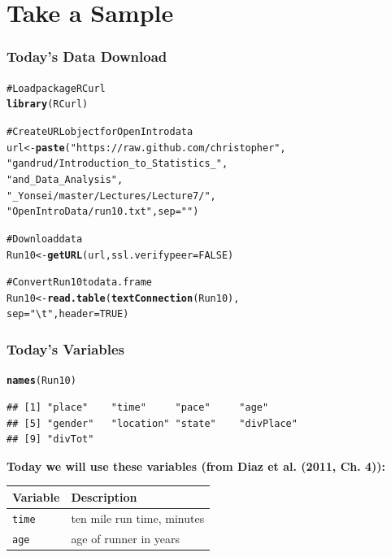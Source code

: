 \documentclass{beamer}\usepackage{graphicx, color}
\makeatletter
\newcommand{\hlfunctioncall}[1]{\textcolor[rgb]{0.501960784313725,0,0.329411764705882}{\textbf{#1}}}%
\newcommand{\hlstring}[1]{\textcolor[rgb]{0.6,0.6,1}{#1}}%
\newcommand{\hlcomment}[1]{\textcolor[rgb]{0.180392156862745,0.6,0.341176470588235}{#1}}%
\newenvironment{kframe}{%
 \def\at@end@of@kframe{}%
 \ifinner\ifhmode%
  \def\at@end@of@kframe{\end{minipage}}%
  \begin{minipage}{\columnwidth}%
 \fi\fi%
 \def\FrameCommand##1{\hskip\@totalleftmargin \hskip-\fboxsep
 \colorbox{shadecolor}{##1}\hskip-\fboxsep
     \hskip-\linewidth \hskip-\@totalleftmargin \hskip\columnwidth}%
 \MakeFramed {\advance\hsize-\width
   \@totalleftmargin\z@ \linewidth\hsize
   \@setminipage}}%
 {\par\unskip\endMakeFramed%
 \at@end@of@kframe}
\newenvironment{knitrout}{}{} %
\makeatother
\begin{document}
\section{Take a Sample}
\begin{frame}[fragile]
  \frametitle{Today's Data Download}
\begin{knitrout}
\color{fgcolor}\begin{kframe}
\begin{alltt}
\hlcomment{# Load package RCurl}
\hlfunctioncall{library}(RCurl)

\hlcomment{# Create URL object for OpenIntro data}
url <- \hlfunctioncall{paste}(\hlstring{"https://raw.github.com/christopher"},
             \hlstring{"gandrud/Introduction_to_Statistics_"},
             \hlstring{"and_Data_Analysis"},
             \hlstring{"_Yonsei/master/Lectures/Lecture7/"},
             \hlstring{"OpenIntroData/run10.txt"}, sep = \hlstring{""})

\hlcomment{# Download data}
Run10 <- \hlfunctioncall{getURL}(url, ssl.verifypeer = FALSE)

\hlcomment{# Convert Run10 to data.frame}
Run10 <- \hlfunctioncall{read.table}(\hlfunctioncall{textConnection}(Run10),
                    sep = \hlstring{"\textbackslash{}t"}, header = TRUE)
\end{alltt}
\end{kframe}
\end{knitrout}

\end{frame}

\begin{frame}[fragile]
  \frametitle{Today's Variables}
\begin{knitrout}
\color{fgcolor}\begin{kframe}
\begin{alltt}
\hlfunctioncall{names}(Run10)
\end{alltt}
\begin{verbatim}
## [1] "place"    "time"     "pace"     "age"     
## [5] "gender"   "location" "state"    "divPlace"
## [9] "divTot"
\end{verbatim}
\end{kframe}
\end{knitrout}


  {\bf{Today we will use these variables (from Diaz et al. (2011, Ch. 4)):}}
  \begin{table}
    \begin{tabular}{l p{4cm}}
      \hline
      Variable & Description \\[0.3cm] 
      \hline\hline
      \texttt{time} & ten mile run time, minutes \\
      \texttt{age} & age of runner in years \\
      \hline
    \end{tabular}
  \end{table}
\end{frame}
\end{document}
